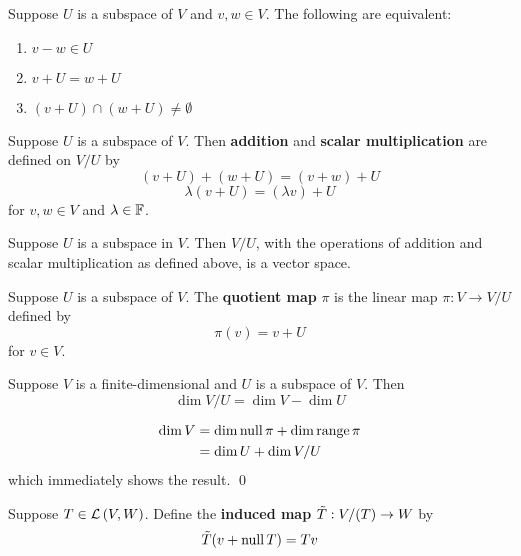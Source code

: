\begin{theorem}
   Suppose $U$ is a subspace of $V$ and $v, w \in V$. The following are equivalent:
   \begin{enumerate}
      \item $v - w \in U$
      \item $v + U = w + U$
      \item $(v + U) \cap (w + U) \neq \emptyset$
   \end{enumerate}
\end{theorem}

\begin{definition} 
   Suppose $U$ is a subspace of $V$. Then \textbf{addition} and
   \textbf{scalar multiplication} are defined on $V / U$ by
   \[ (v + U) + (w + U) = (v + w) + U \]
   \[ \lambda(v + U) = (\lambda v) + U \]
   for $v, w \in V$ and $\lambda \in \operatorname{\mathbb{F}}$.
\end{definition}

\begin{theorem} 
   Suppose $U$ is a subspace in $V$. Then $V/U$, with the operations
   of addition and scalar multiplication as defined above,
   is a vector space.
\end{theorem}

\begin{definition} 
   Suppose $U$ is a subspace of $V$. The \textbf{quotient map} $\pi$
   is the linear map $\pi : V \to V/U$ defined by
   \[ \pi(v) = v + U \]
   for $v \in V$.
\end{definition}

\begin{theorem} 
   Suppose $V$ is a finite-dimensional and $U$ is a subspace of $V$. Then
   \[ \dim V/U = \dim V - \dim U \]

   \begin{proof*}
      \begin{align*}
         \dim V &= \dim \operatorname{null} \pi + \dim \operatorname{range} \pi \\
         &= \dim U + \dim V/U
      \end{align*}
      which immediately shows the result. \qed
   \end{proof*}
\end{theorem}

\begin{definition} 
   Suppose $T \in \mathcal{L} \left( V, W \right)$. Define the \textbf{induced map} $\tilde{T} : V / (\null T) \to W$ by
   \[ \tilde{T}(v + \operatorname{null} T) = Tv \]
\end{definition}

